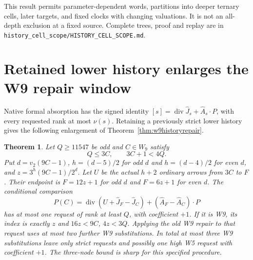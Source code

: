 \documentclass[11pt]{article}
\newtheorem{theorem}{Theorem}
\begin{document}
This result permits parameter-dependent words, partitions into deeper
ternary cells, later targets, and fixed clocks with changing valuations.
It is not an all-depth exclusion at a fixed source. Complete trees,
proof and replay are in
\texttt{history\_cell\_scope/HISTORY\_CELL\_SCOPE.md}.

\section{Retained lower history enlarges the W9 repair window}
Native formal absorption has the signed identity
$[s]=\operatorname{div}\widehat J_s+\widehat A_s\cdot P$,
with every requested rank at most $\nu(s)$. Retaining a previously
strict lower history gives the following enlargement of
Theorem~\ref{thm:w9historyrepair}.

\begin{theorem}\label{thm:retainedhistoryrepair}
Let $Q\ge11547$ be odd and $C\in W_9$ satisfy
\[
 Q\le3C,\qquad3C+1<4Q.
\]
Put $d=v_2(9C-1)$, $h=(d-5)/2$ for odd $d$ and $h=(d-4)/2$
for even $d$, and $z=3^h(9C-1)/2^d$.
Let $U$ be the actual $h+2$ ordinary arrows from $3C$ to $F$.
Their endpoint is $F=12z+1$ for odd $d$ and $F=6z+1$ for even $d$.
The conditional comparison
\[
 P(C)=\operatorname{div}(U+\widehat J_F-\widehat J_C)
            +(\widehat A_F-\widehat A_C)\cdot P
\]
has at most one request of rank at least $Q$, with coefficient $+1$.
If it is W9, its index is exactly $z$ and $16z<9C$, $4z<3Q$.
Applying the old W9 repair to that request uses at most two further
W9 substitutions. In total at most three W9 substitutions leave only
strict requests and possibly one high W5 request with coefficient $+1$.
The three-node bound is sharp for this specified procedure.
\end{theorem}
\end{document}
